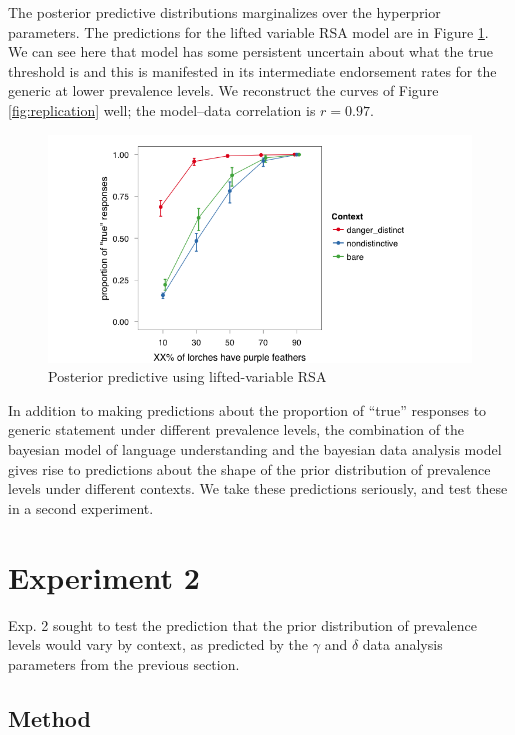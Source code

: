 \documentclass[10pt,letterpaper]{article}
\begin{document}
The posterior predictive distributions marginalizes over the hyperprior parameters. The predictions for the lifted variable RSA model are in Figure \ref{fig:postpred2}. We can see here that model has some persistent uncertain about what the true threshold is and this is manifested in its intermediate endorsement rates for the generic at lower prevalence levels. We reconstruct the curves of Figure \ref{fig:replication} well; the model--data correlation is $r = 0.97$. 

\begin{figure}
\centering
    \includegraphics[width=\columnwidth]{fig5_bda2_postpred}
    \caption{Posterior predictive using lifted-variable RSA}
  \label{fig:postpred2}
\end{figure}

In addition to making predictions about the proportion of ``true'' responses to generic statement under different prevalence levels, the combination of the bayesian model of language understanding and the bayesian data analysis model gives rise to predictions about the shape of the prior distribution of prevalence levels under different contexts. We take these predictions seriously, and test these in a second experiment. 

\section{Experiment 2}

Exp. 2 sought to test the prediction that the prior distribution of prevalence levels would vary by context, as predicted by the $\gamma$ and $\delta$ data analysis parameters from the previous section.

\subsection{Method}
\end{document}
